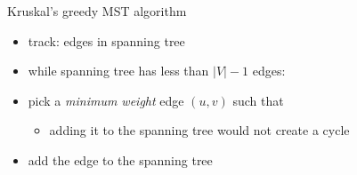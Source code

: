 \begin{frame}{Kruskal's greedy MST algorithm}
    \begin{itemize}
    \item track: edges in spanning tree
    \vspace{.5cm}
    \item while spanning tree has less than $|V|-1$ edges:
    \item pick a \textit{minimum weight} edge $(u, v)$ such that
        \begin{itemize}
        \item adding it to the spanning tree would not create a cycle
        \end{itemize}
    \item add the edge to the spanning tree
    \end{itemize}
\end{frame}
